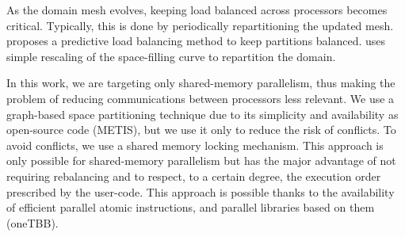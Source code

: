 As the domain mesh evolves, keeping load balanced across processors becomes
critical. Typically, this is done by periodically repartitioning the updated mesh.
\citet{zhou2012tools} proposes a predictive load balancing method to keep
partitions balanced. \citet{marot2019one} uses simple rescaling of the
space-filling curve to repartition the domain.

In this work, we are targeting only shared-memory parallelism, thus making the problem of reducing communications between processors less relevant. We use a graph-based space partitioning technique \cite{karypis1998fast} due to its simplicity and availability as open-source code (METIS), but we use it only to reduce the risk of conflicts. To avoid conflicts, we use a shared memory locking mechanism. This approach is only possible for shared-memory parallelism but has the major advantage of not requiring rebalancing and to respect, to a certain degree, the execution order prescribed by the user-code. This approach is possible thanks to the availability of efficient parallel atomic instructions, and parallel libraries based on them (oneTBB).






